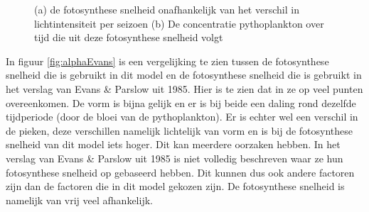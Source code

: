 \begin{figure}[H]
    \centering

    \caption{(a) de fotosynthese snelheid onafhankelijk van het verschil in lichtintensiteit per seizoen (b) De concentratie pythoplankton over tijd die uit deze fotosynthese snelheid volgt}
    \label{fig:alphaP}
\end{figure}

In figuur \ref{fig:alphaEvans} is een vergelijking te zien tussen de fotosynthese snelheid die is gebruikt in dit model en de fotosynthese snelheid die is gebruikt in het verslag van Evans \& Parslow uit 1985. Hier is te zien dat in ze op veel punten overeenkomen. De vorm is bijna gelijk en er is bij beide een daling rond dezelfde tijdperiode (door de bloei van de pythoplankton). Er is echter wel een verschil in de pieken, deze verschillen namelijk lichtelijk van vorm en is bij de fotosynthese snelheid van dit model iets hoger. Dit kan meerdere oorzaken hebben. In het verslag van Evans \& Parslow uit 1985 is niet volledig beschreven waar ze hun fotosynthese snelheid op gebaseerd hebben. Dit kunnen dus ook andere factoren zijn dan de factoren die in dit model gekozen zijn. De fotosynthese snelheid is namelijk van vrij veel afhankelijk. 


